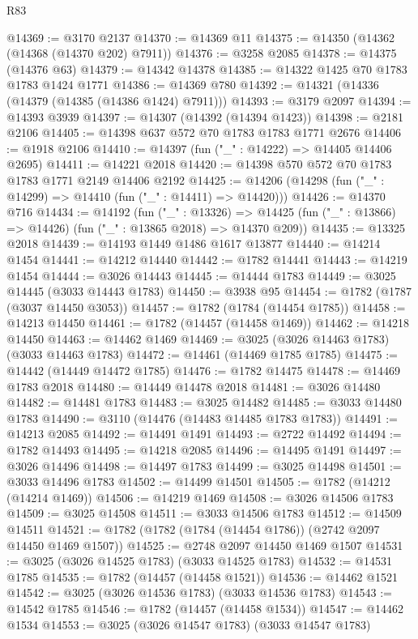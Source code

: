 \begin{lexlean}{R83}
\begin{coremodule}
@14369 := @3170 @2137
@14370 := @14369 @11
@14375 := @14350 (@14362 (@14368 (@14370 @202) @7911))
@14376 := @3258 @2085
@14378 := @14375 (@14376 @63)
@14379 := @14342 @14378
@14385 := @14322 @1425 @70 @1783 @1783 @1424 @1771
@14386 := @14369 @780
@14392 := @14321 (@14336 (@14379 (@14385 (@14386 @1424) @7911)))
@14393 := @3179 @2097
@14394 := @14393 @3939
@14397 := @14307 (@14392 (@14394 @1423))
@14398 := @2181 @2106
@14405 := @14398 @637 @572 @70 @1783 @1783 @1771 @2676
@14406 := @1918 @2106
@14410 := @14397 (fun ("_" : @14222) => @14405 @14406 @2695)
@14411 := @14221 @2018
@14420 := @14398 @570 @572 @70 @1783 @1783 @1771 @2149 @14406 @2192
@14425 := @14206 (@14298 (fun ("_" : @14299) => @14410 (fun ("_" : @14411) => @14420)))
@14426 := @14370 @716
@14434 := @14192
    (fun ("_" : @13326) =>
    @14425 (fun ("_" : @13866) => @14426) (fun ("_" : @13865 @2018) => @14370 @209))
@14435 := @13325 @2018
@14439 := @14193 @1449 @1486 @1617 @13877
@14440 := @14214 @1454
@14441 := @14212 @14440
@14442 := @1782 @14441
@14443 := @14219 @1454
@14444 := @3026 @14443
@14445 := @14444 @1783
@14449 := @3025 @14445 (@3033 @14443 @1783)
@14450 := @3938 @95
@14454 := @1782 (@1787 (@3037 @14450 @3053))
@14457 := @1782 (@1784 (@14454 @1785))
@14458 := @14213 @14450
@14461 := @1782 (@14457 (@14458 @1469))
@14462 := @14218 @14450
@14463 := @14462 @1469
@14469 := @3025 (@3026 @14463 @1783) (@3033 @14463 @1783)
@14472 := @14461 (@14469 @1785 @1785)
@14475 := @14442 (@14449 @14472 @1785)
@14476 := @1782 @14475
@14478 := @14469 @1783 @2018
@14480 := @14449 @14478 @2018
@14481 := @3026 @14480
@14482 := @14481 @1783
@14483 := @3025 @14482
@14485 := @3033 @14480 @1783
@14490 := @3110 (@14476 (@14483 @14485 @1783 @1783))
@14491 := @14213 @2085
@14492 := @14491 @1491
@14493 := @2722 @14492
@14494 := @1782 @14493
@14495 := @14218 @2085
@14496 := @14495 @1491
@14497 := @3026 @14496
@14498 := @14497 @1783
@14499 := @3025 @14498
@14501 := @3033 @14496 @1783
@14502 := @14499 @14501
@14505 := @1782 (@14212 (@14214 @1469))
@14506 := @14219 @1469
@14508 := @3026 @14506 @1783
@14509 := @3025 @14508
@14511 := @3033 @14506 @1783
@14512 := @14509 @14511
@14521 := @1782 (@1782 (@1784 (@14454 @1786)) (@2742 @2097 @14450 @1469 @1507))
@14525 := @2748 @2097 @14450 @1469 @1507
@14531 := @3025 (@3026 @14525 @1783) (@3033 @14525 @1783)
@14532 := @14531 @1785
@14535 := @1782 (@14457 (@14458 @1521))
@14536 := @14462 @1521
@14542 := @3025 (@3026 @14536 @1783) (@3033 @14536 @1783)
@14543 := @14542 @1785
@14546 := @1782 (@14457 (@14458 @1534))
@14547 := @14462 @1534
@14553 := @3025 (@3026 @14547 @1783) (@3033 @14547 @1783)

\end{coremodule}
\end{lexlean}
